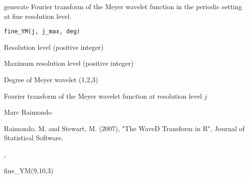 \documentclass{article}
\begin{document}
\begin{Description}\relax
generate Fourier transform  of the Meyer wavelet function in the periodic setting
at fine resolution level.
\end{Description}
\begin{Usage}
\begin{verbatim}
fine_YM(j, j_max, deg)
\end{verbatim}
\end{Usage}
\begin{Arguments}
\begin{ldescription}
\item[\code{j}] Resolution level (positive integer) 
\item[\code{j\_max}] Maximum resolution level (positive integer)
\item[\code{deg}] Degree of Meyer wavelet (1,2,3) 
\end{ldescription}
\end{Arguments}
\begin{Value}
Fourier transform  of the Meyer wavelet function at resolution level $j$
\end{Value}
\begin{Author}\relax
Marc Raimondo
\end{Author}
\begin{References}\relax
Raimondo, M. and Stewart, M. (2007),
"The WaveD Transform in R", Journal of Statistical Software.
\end{References}
\begin{SeeAlso}\relax
{},
\end{SeeAlso}
\begin{Examples}
\begin{ExampleCode}
fine_YM(9,10,3)
\end{ExampleCode}
\end{Examples}
\end{document}
